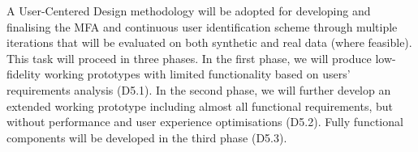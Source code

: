 \begin{Workpackage}{\thewpno}
\begin{Task}
A User-Centered Design methodology will be adopted for developing and finalising the MFA and continuous user identification scheme through multiple iterations that will be evaluated on both synthetic and real data (where feasible). 
This task will proceed in three phases. In the first phase, we will produce low-fidelity working prototypes with limited functionality based on users’ requirements analysis (D5.1). In the second phase, we will further develop an extended working prototype including almost all functional requirements, but without performance and user experience optimisations (D5.2). Fully functional components will be developed in the third phase (D5.3). 

\end{Task}
\end{Workpackage}
